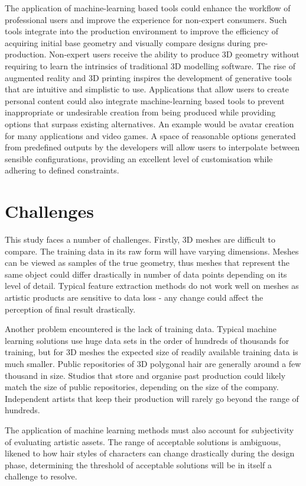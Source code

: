 \documentclass[ %
                    author={Dillon Keith Diep [INCOMPLETE DRAFT, NOT FOR SUBMISSION]},
                supervisor={Dr. Carl Henrik Ek},
                    degree={MEng},
                     title={ART-CG:},
                  subtitle={Assisted Real-Time Content Generation of 3D Hair Geometry},
                      type={Research},
                      year={2014} ]{dissertation}
\begin{document}
The application of machine-learning based tools could enhance the workflow of professional users and improve the experience for non-expert consumers. Such tools integrate into the production environment to improve the efficiency of acquiring initial base geometry and visually compare designs during pre-production. Non-expert users receive the ability to produce 3D geometry without requiring to learn the intrinsics of traditional 3D modelling software. The rise of augmented reality and 3D printing inspires the development of generative tools that are intuitive and simplistic to use. Applications that allow users to create personal content could also integrate machine-learning based tools to prevent inappropriate or undesirable creation from being produced while providing options that surpass existing alternatives. An example would be avatar creation for many applications and video games. A space of reasonable options generated from predefined outputs by the developers will allow users to interpolate between sensible configurations, providing an excellent level of customisation while adhering to defined constraints.

\section{Challenges}
This study faces a number of challenges. Firstly, 3D meshes are difficult to compare. The training data in its raw form will have varying dimensions. Meshes can be viewed as samples of the true geometry, thus meshes that represent the same object could differ drastically in number of data points depending on its level of detail. Typical feature extraction methods do not work well on meshes as artistic products are sensitive to data loss - any change could affect the perception of final result drastically.

Another problem encountered is the lack of training data. Typical machine learning solutions use huge data sets in the order of hundreds of thousands for training, but for 3D meshes the expected size of readily available training data is much smaller. Public repositories of 3D polygonal hair are generally around a few thousand in size. Studios that store and organise past production could likely match the size of public repositories, depending on the size of the company. Independent artists that keep their production will rarely go beyond the range of hundreds.
\cite{tsr}

The application of machine learning methods must also account for subjectivity of evaluating artistic assets. The range of acceptable solutions is ambiguous, likened to how hair styles of characters can change drastically during the design phase, determining the threshold of acceptable solutions will be in itself a challenge to resolve.
\end{document}
